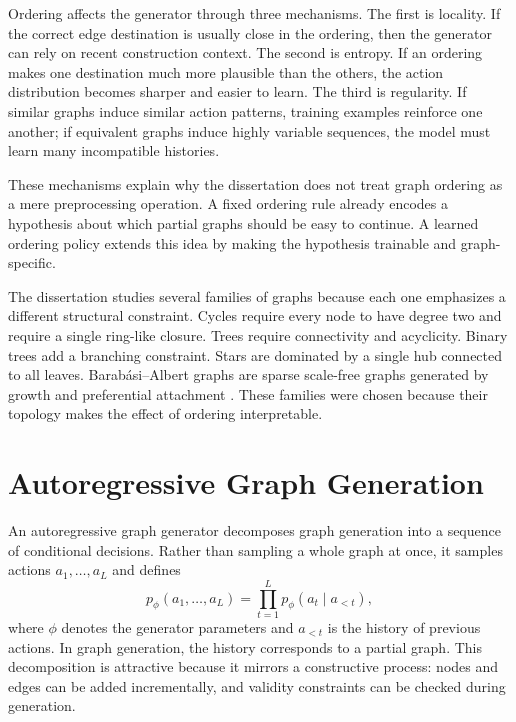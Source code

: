 Ordering affects the generator through three mechanisms. The first is locality. If the correct edge destination is usually close in the ordering, then the generator can rely on recent construction context. The second is entropy. If an ordering makes one destination much more plausible than the others, the action distribution becomes sharper and easier to learn. The third is regularity. If similar graphs induce similar action patterns, training examples reinforce one another; if equivalent graphs induce highly variable sequences, the model must learn many incompatible histories.

These mechanisms explain why the dissertation does not treat graph ordering as a mere preprocessing operation. A fixed ordering rule already encodes a hypothesis about which partial graphs should be easy to continue. A learned ordering policy extends this idea by making the hypothesis trainable and graph-specific.

The dissertation studies several families of graphs because each one emphasizes a different structural constraint. Cycles require every node to have degree two and require a single ring-like closure. Trees require connectivity and acyclicity. Binary trees add a branching constraint. Stars are dominated by a single hub connected to all leaves. Barab\'asi--Albert graphs are sparse scale-free graphs generated by growth and preferential attachment \cite{barabasi1999emergence}. These families were chosen because their topology makes the effect of ordering interpretable.

\section{Autoregressive Graph Generation}
\label{sec:autoregressive-generation}

An autoregressive graph generator decomposes graph generation into a sequence of conditional decisions. Rather than sampling a whole graph at once, it samples actions $a_1,\ldots,a_L$ and defines
\begin{equation}
    p_{\phi}(a_1,\ldots,a_L)
    = \prod_{t=1}^{L} p_{\phi}(a_t \mid a_{<t}),
\end{equation}
where $\phi$ denotes the generator parameters and $a_{<t}$ is the history of previous actions. In graph generation, the history corresponds to a partial graph. This decomposition is attractive because it mirrors a constructive process: nodes and edges can be added incrementally, and validity constraints can be checked during generation.

